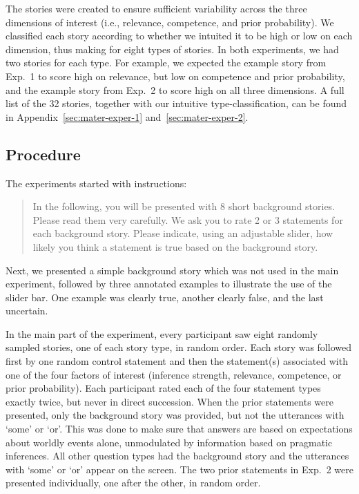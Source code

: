 \documentclass[12pt]{article}
\begin{document}
The stories were created to ensure sufficient variability across the three dimensions of
interest (i.e., relevance, competence, and prior probability). We classified each story
according to whether we intuited it to be high or low on each dimension, thus making for eight
types of stories. In both experiments, we had two stories for each type. For example, we
expected the example story from Exp.\ 1 to score high on relevance, but low on competence and
prior probability, and the example story from Exp.\ 2 to score high on all three dimensions. A
full list of the 32 stories, together with our intuitive type-classification, can be found in
Appendix~\ref{sec:mater-exper-1} and~\ref{sec:mater-exper-2}.

\subsection*{Procedure}

The experiments started with instructions:

\begin{quote}
  In the following, you will be presented with 8 short background stories. Please read them
  very carefully. We ask you to rate 2 or 3 statements for each background story. Please
  indicate, using an adjustable slider, how likely you think a statement is true based on the
  background story.
\end{quote}

\noindent Next, we presented a simple background story which was not used in the main
experiment, followed by three annotated examples to illustrate the use of the slider bar. One example was clearly true, another clearly false, and the last uncertain.

In the main part of the experiment, every participant saw eight randomly sampled stories, one
of each story type, in random order. Each story was followed first by one random control
statement and then the statement(s) associated with one of the four factors of interest
(inference strength, relevance, competence, or prior probability). Each participant rated each
of the four statement types exactly twice, but never in direct succession. When the prior
statements were presented, only the background story was provided, but not the utterances with
`some' or `or'. This was done to make sure that answers are based on expectations about
worldly events alone, unmodulated by information based on pragmatic inferences. All other
question types had the background story and the utterances with `some' or `or' appear on the
screen. The two prior statements in Exp.\ 2 were presented individually, one after the other,
in random order.
\end{document}
